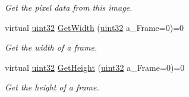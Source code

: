 \begin{DoxyCompactItemize}
\begin{DoxyCompactList}\small\item\em Get the pixel data from this image. \item\end{DoxyCompactList}\item 
virtual \hyperlink{namespacetil_a20db61688ed403d11f057a508d87e54c}{uint32} \hyperlink{classtil_1_1_image_a769be7e5a2cc490e8ae70b7c29a56eca}{GetWidth} (\hyperlink{namespacetil_a20db61688ed403d11f057a508d87e54c}{uint32} a\_\-Frame=0)=0
\begin{DoxyCompactList}\small\item\em Get the width of a frame. \item\end{DoxyCompactList}\item 
virtual \hyperlink{namespacetil_a20db61688ed403d11f057a508d87e54c}{uint32} \hyperlink{classtil_1_1_image_ad623add911ba5230f56a4cc58af75ec1}{GetHeight} (\hyperlink{namespacetil_a20db61688ed403d11f057a508d87e54c}{uint32} a\_\-Frame=0)=0
\begin{DoxyCompactList}\small\item\em Get the height of a frame. \item\end{DoxyCompactList}\end{DoxyCompactItemize}
